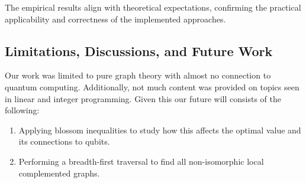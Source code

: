 \documentclass[12pt]{report} %
\begin{document}
The empirical results align with theoretical expectations, confirming the practical applicability and correctness of the implemented approaches. 

\subsection*{Limitations, Discussions, and Future Work}

Our work was limited to pure graph theory with almost no connection to quantum computing. Additionally, not much content was provided on topics seen in linear and integer programming. Given this our future will consists of the following: 

\begin{enumerate}[label=(\roman*), font=\itshape]
    \item Applying blossom inequalities to study how this affects the optimal value and its connections to qubits. 
    \item Performing a breadth-first traversal to find all non-isomorphic local complemented graphs. 
\end{enumerate}
\newpage



\end{document}

